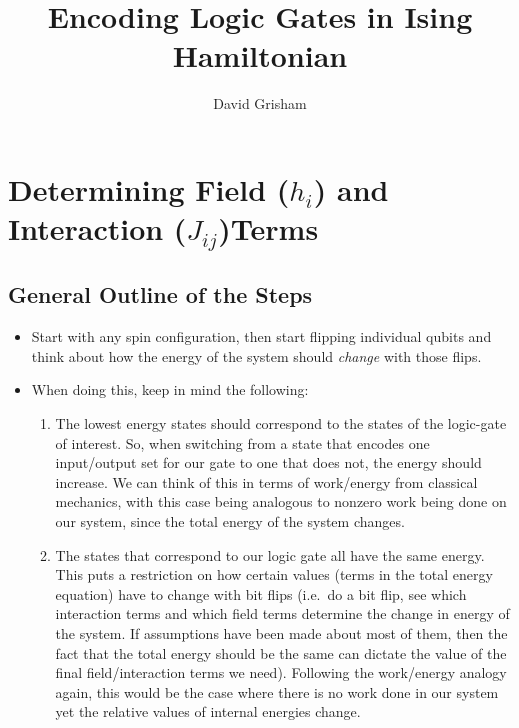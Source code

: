 \documentclass[]{article}
\title{Encoding Logic Gates in Ising Hamiltonian}
\author{David Grisham}
\date{}
\begin{document}
\maketitle

\vspace{-0.8cm}

\section{\texorpdfstring{Determining Field (\(h_i\)) and Interaction
(\(J_{ij}\))Terms}{Determining Field (h\_i) and Interaction (J\_\{ij\})Terms}}\label{determining-field-hux5fi-and-interaction-jux5fijterms}

\subsection{General Outline of the
Steps}\label{general-outline-of-the-steps}

\begin{itemize}
\tightlist
\item
  Start with any spin configuration, then start flipping individual
  qubits and think about how the energy of the system should
  \emph{change} with those flips.
\item
  When doing this, keep in mind the following:

  \begin{enumerate}
  \def\labelenumi{\arabic{enumi}.}
  \tightlist
  \item
    The lowest energy states should correspond to the states of the
    logic-gate of interest. So, when switching from a state that encodes
    one input/output set for our gate to one that does not, the energy
    should increase. We can think of this in terms of work/energy from
    classical mechanics, with this case being analogous to nonzero work
    being done on our system, since the total energy of the system
    changes.
  \item
    The states that correspond to our logic gate all have the same
    energy. This puts a restriction on how certain values (terms in the
    total energy equation) have to change with bit flips (i.e.~do a bit
    flip, see which interaction terms and which field terms determine
    the change in energy of the system. If assumptions have been made
    about most of them, then the fact that the total energy should be
    the same can dictate the value of the final field/interaction terms
    we need). Following the work/energy analogy again, this would be the
    case where there is no work done in our system yet the relative
    values of internal energies change.
  \end{enumerate}
\end{itemize}
\end{document}
